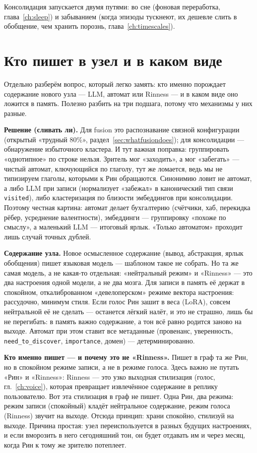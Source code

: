 Консолидация запускается двумя путями: во сне (фоновая переработка,
глава~\ref{ch:sleep}) и забыванием (когда эпизоды тускнеют, их дешевле слить в
обобщение, чем хранить порознь, глава~\ref{ch:timescales}).

\section{Кто пишет в узел и в каком виде}
\label{sec:whowrites}

Отдельно разберём вопрос, который легко замять: кто именно порождает содержание
нового узла --- LLM, автомат или Rinness --- и в каком виде оно ложится в
память. Полезно разбить на три подшага, потому что механизмы у них разные.

\smallskip\noindent\textbf{Решение (сливать ли).}
Для fusion это распознавание связной конфигурации (открытый «трудный 80\%»,
раздел~\ref{sec:whatfusiondoes}); для консолидации --- обнаружение избыточного
кластера. И тут важная поправка: группировать «однотипное» по строке нельзя.
Зритель мог «заходить», а мог «забегать» --- чистый автомат, ключующийся по
глаголу, тут же ломается, ведь мы не типизируем глаголы, которыми к Рин
обращаются. Синонимию ловит не автомат, а либо LLM при записи (нормализует
«забежал» в канонический тип связи \texttt{visited}), либо кластеризация по
близости эмбеддингов при консолидации. Поэтому честная картина: автомат делает
бухгалтерию (счётчики, хаб, перекидка рёбер, усреднение валентности),
эмбеддинги --- группировку «похоже по смыслу», а маленький LLM --- итоговый
ярлык. «Только автоматом» проходит лишь случай точных дублей.

\smallskip\noindent\textbf{Содержание узла.}
Новое осмысленное содержание (вывод, абстракция, ярлык обобщения) пишет
языковая модель --- шаблоном такое не собрать. Но та же самая модель, а не
какая-то отдельная: «нейтральный режим» и «Rinness» --- это два настроения
одной модели, а не два мозга. Для записи в память её держат в спокойном,
откалиброванном «девелоперском» режиме вектора настроения: рассудочно, минимум
стиля. Если голос Рин зашит в веса (LoRA), совсем нейтральной её не сделать ---
останется лёгкий налёт, и это не страшно, лишь бы не перегибать: в память важно
содержание, а тон всё равно родится заново на выходе. Автомат при этом ставит
все метаданные (провенанс, уверенность, \texttt{need\_to\_discover},
\texttt{importance}, домен) --- детерминированно.

\smallskip\noindent\textbf{Кто именно пишет --- и почему это не «Rinness».}
Пишет в граф та же Рин, но в спокойном режиме записи, а не в режиме голоса.
Здесь важно не путать «Рин» и «Rinness»: Rinness --- это узко выходная
стилизация (голос, гл.~\ref{ch:voice}), которая превращает извлечённое
содержание в реплику пользователю. Вот эта стилизация в граф не пишет. Одна
Рин, два режима: режим записи (спокойный) кладёт нейтральное содержание, режим
голоса (Rinness) звучит на выходе. Отсюда принцип: храни спокойно, стилизуй на
выходе. Причина простая: узел переиспользуется в разных будущих настроениях, и
если вморозить в него сегодняшний тон, он будет отдавать им и через месяц,
когда Рин к тому же зрителю потеплеет.

